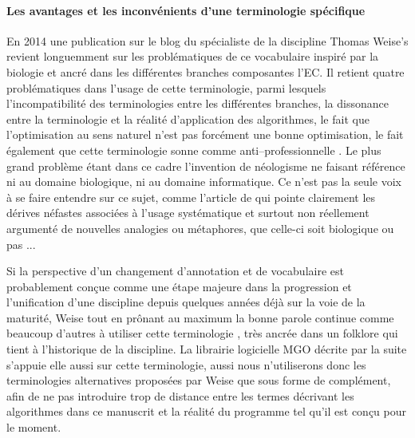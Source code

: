 \paragraph{Les avantages et les inconvénients d'une terminologie spécifique}

En 2014 une publication sur le blog du spécialiste de la discipline Thomas Weise's  revient longuemment sur les problématiques de ce vocabulaire inspiré par la biologie et ancré dans les différentes branches composantes l'EC. Il retient quatre problématiques dans l'usage de cette terminologie, parmi lesquels l'incompatibilité des terminologies entre les différentes branches, la dissonance entre la terminologie et la réalité d'application des algorithmes, le fait que l'optimisation au sens naturel n'est pas forcément une bonne optimisation, le fait également que cette terminologie sonne comme anti--professionnelle . Le plus grand problème étant dans ce cadre l'invention de néologisme ne faisant référence ni au domaine biologique, ni au domaine informatique. Ce n'est pas la seule voix à se faire entendre sur ce sujet, comme l'article de \textcite{Sorensen2013b} qui pointe clairement les dérives néfastes associées à l'usage systématique et surtout non réellement argumenté de nouvelles analogies ou métaphores, que celle-ci soit biologique ou pas ...

Si la perspective d'un changement d'annotation et de vocabulaire est probablement conçue comme une étape majeure dans la progression et l'unification d'une discipline depuis quelques années déjà sur la voie de la maturité, Weise tout en prônant au maximum la bonne parole continue comme beaucoup d'autres à utiliser cette terminologie \autocite{Weise2011}, très ancrée dans un folklore qui tient à l'historique de la discipline. La librairie logicielle MGO décrite par la suite s'appuie elle aussi sur cette terminologie, aussi nous n'utiliserons donc les terminologies alternatives proposées par Weise que sous forme de complément, afin de ne pas introduire trop de distance entre les termes décrivant les algorithmes dans ce manuscrit et la réalité du programme tel qu'il est conçu pour le moment.

